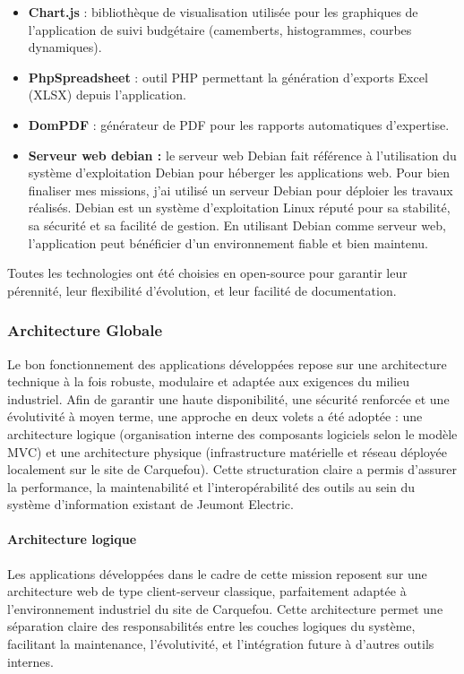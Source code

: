 \documentclass[11pt,a4paper]{article}
\begin{document}
\begin{itemize}
\item \textbf{Chart.js} : bibliothèque de visualisation utilisée pour les graphiques de l’application de suivi budgétaire (camemberts, histogrammes, courbes dynamiques).

\item \textbf{PhpSpreadsheet} : outil PHP permettant la génération d’exports Excel (XLSX) depuis l’application.

\item \textbf{DomPDF} : générateur de PDF pour les rapports automatiques d’expertise.

\item \textbf{Serveur web debian : }
le serveur web Debian fait référence à l'utilisation du système d'exploitation Debian pour héberger les applications web. Pour bien finaliser mes missions, j’ai utilisé un serveur Debian pour déploier les travaux réalisés.  Debian est un système d'exploitation Linux réputé pour sa stabilité, sa sécurité et sa facilité de gestion. En utilisant Debian comme serveur web, l'application peut bénéficier d'un environnement fiable et bien maintenu.
\end{itemize}

Toutes les technologies ont été choisies en open-source pour garantir leur pérennité, leur flexibilité d’évolution, et leur facilité de documentation.

\subsubsection{Architecture Globale}

Le bon fonctionnement des applications développées repose sur une architecture technique à la fois robuste, modulaire et adaptée aux exigences du milieu industriel. Afin de garantir une haute disponibilité, une sécurité renforcée et une évolutivité à moyen terme, une approche en deux volets a été adoptée : une architecture logique (organisation interne des composants logiciels selon le modèle MVC) et une architecture physique (infrastructure matérielle et réseau déployée localement sur le site de Carquefou). Cette structuration claire a permis d’assurer la performance, la maintenabilité et l’interopérabilité des outils au sein du système d’information existant de Jeumont Electric.

\paragraph{Architecture logique}
Les applications développées dans le cadre de cette mission reposent sur une architecture web de type client-serveur classique, parfaitement adaptée à l’environnement industriel du site de Carquefou. Cette architecture permet une séparation claire des responsabilités entre les couches logiques du système, facilitant la maintenance, l’évolutivité, et l’intégration future à d’autres outils internes.
\end{document}
